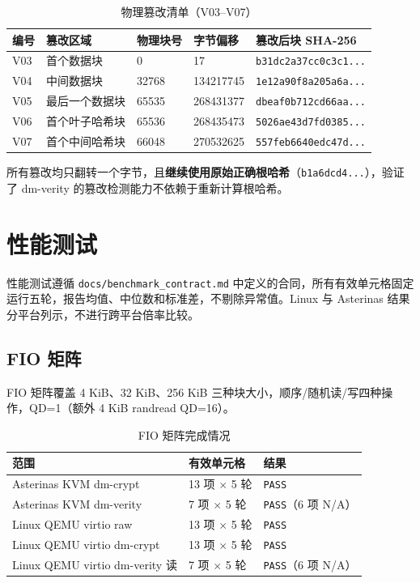 \begin{table}[H]
    \centering
    \small
    \caption{物理篡改清单（V03--V07）}
    \begin{tabular}{p{}p{}p{}p{}p{}}
        \toprule
        \textbf{编号} & \textbf{篡改区域} & \textbf{物理块号} & \textbf{字节偏移} & \textbf{篡改后块 SHA-256} \\
        \midrule
        V03 & 首个数据块 & 0 & 17 & \texttt{b31dc2a37cc0c3c1...} \\
        V04 & 中间数据块 & 32768 & 134217745 & \texttt{1e12a90f8a205a6a...} \\
        V05 & 最后一个数据块 & 65535 & 268431377 & \texttt{dbeaf0b712cd66aa...} \\
        V06 & 首个叶子哈希块 & 65536 & 268435473 & \texttt{5026ae43d7fd0385...} \\
        V07 & 首个中间哈希块 & 66048 & 270532625 & \texttt{557feb6640edc47d...} \\
        \bottomrule
    \end{tabular}
\end{table}

所有篡改均只翻转一个字节，且\textbf{继续使用原始正确根哈希}（\texttt{b1a6dcd4...}），验证了 dm-verity 的篡改检测能力不依赖于重新计算根哈希。

\section{性能测试}

性能测试遵循 \texttt{docs/benchmark\_contract.md} 中定义的合同，所有有效单元格固定运行五轮，报告均值、中位数和标准差，不剔除异常值。Linux 与 Asterinas 结果分平台列示，不进行跨平台倍率比较。

\subsection{FIO 矩阵}

FIO 矩阵覆盖 4 KiB、32 KiB、256 KiB 三种块大小，顺序/随机读/写四种操作，QD=1（额外 4 KiB randread QD=16）。

\begin{table}[H]
    \centering
    \caption{FIO 矩阵完成情况}
    \begin{tabular}{p{}p{}p{}}
        \toprule
        \textbf{范围} & \textbf{有效单元格} & \textbf{结果} \\
        \midrule
        Asterinas KVM dm-crypt & 13 项 $\times$ 5 轮 & \texttt{PASS} \\
        Asterinas KVM dm-verity & 7 项 $\times$ 5 轮 & \texttt{PASS}（6 项 N/A） \\
        Linux QEMU virtio raw & 13 项 $\times$ 5 轮 & \texttt{PASS} \\
        Linux QEMU virtio dm-crypt & 13 项 $\times$ 5 轮 & \texttt{PASS} \\
        Linux QEMU virtio dm-verity 读 & 7 项 $\times$ 5 轮 & \texttt{PASS}（6 项 N/A） \\
        \bottomrule
    \end{tabular}
\end{table}

